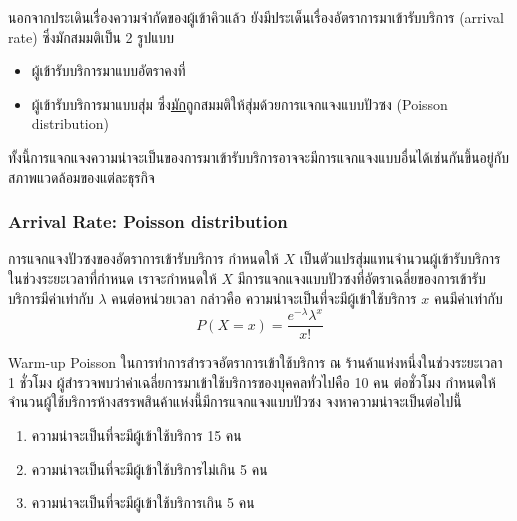 นอกจากประเดินเรื่องความจำกัดของผู้เข้าคิวแล้ว ยังมีประเด็นเรื่องอัตราการมาเข้ารับบริการ (arrival rate) ซึ่งมักสมมติเป็น 2 รูปแบบ
\begin{itemize}
	\item ผู้เข้ารับบริการมาแบบอัตราคงที่
	\item ผู้เข้ารับบริการมาแบบสุ่ม ซึ่ง\underline{มัก}ถูกสมมติให้สุ่มด้วยการแจกแจงแบบปัวซง (Poisson distribution) 
\end{itemize}
ทั้งนี้การแจกแจงความน่าจะเป็นของการมาเข้ารับบริการอาจจะมีการแจกแจงแบบอื่นได้เช่นกันขึ้นอยู่กับสภาพแวดล้อมของแต่ละธุรกิจ

\subsubsection*{Arrival Rate: Poisson distribution}
\begin{property}
	{การแจกแจงปัวซงของอัตราการเข้ารับบริการ}{}
	กำหนดให้ $X$ เป็นตัวแปรสุ่มแทนจำนวนผู้เข้ารับบริการในช่วงระยะเวลาที่กำหนด เราจะกำหนดให้ $X$ มีการแจกแจงแบบปัวซงที่อัตราเฉลี่ยของการเข้ารับบริการมีค่าเท่ากับ $\lambda$ คนต่อหน่วยเวลา กล่าวคือ ความน่าจะเป็นที่จะมีผู้เข้าใช้บริการ $x$ คนมีค่าเท่ากับ
	$$
	P(X = x) = \frac{e^{-\lambda}\lambda^x}{x!}
	$$
\end{property}
\begin{example}
	{Warm-up Poisson}{}
	ในการทำการสำรวจอัตราการเข้าใช้บริการ ณ ร้านค้าแห่งหนึ่งในช่วงระยะเวลา 1 ชั่วโมง ผู้สำรวจพบว่าค่าเฉลี่ยการมาเข้าใช้บริการของบุคคลทั่วไปคือ 10 คน ต่อชั่วโมง กำหนดให้จำนวนผู้ใช้บริการห้างสรรพสินค้าแห่งนี้มีการแจกแจงแบบปัวซง จงหาความน่าจะเป็นต่อไปนี้
	\begin{enumerate}
		\item ความน่าจะเป็นที่จะมีผู้เข้าใช้บริการ 15 คน
		\item ความน่าจะเป็นที่จะมีผู้เข้าใช้บริการไม่เกิน 5 คน
		\item ความน่าจะเป็นที่จะมีผู้เข้าใช้บริการเกิน 5 คน
	\end{enumerate}
\end{example}
\newpage
